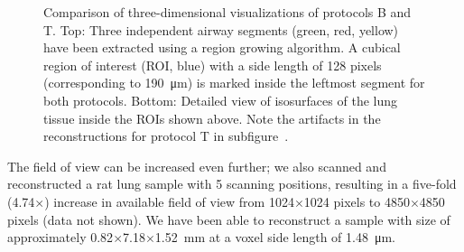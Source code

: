 \begin{figure}[htp]
{%
			}%
		\caption{Comparison of three-dimensional visualizations of protocols B and T. Top: Three independent airway segments (green, red, yellow) have been extracted using a region growing algorithm. A cubical region of interest (ROI, blue) with a side length of 128 pixels (corresponding to \SI{190}{\micro\meter}) is marked inside the leftmost segment for both protocols. Bottom: Detailed view of isosurfaces of the lung tissue inside the ROIs shown above. Note the artifacts in the reconstructions for protocol T in subfigure~.}%
		\label{fig:BvsT}%
	\end{figure}
\fi

The field of view can be increased even further; we also scanned and reconstructed a rat lung sample with 5 scanning positions, resulting in a five-fold (4.74$\times$) increase in available field of view from 1024$\times$1024 pixels to 4850$\times$4850 pixels (data not shown). We have been able to reconstruct a sample with size of approximately 0.82$\times$7.18$\times$\SI{1.52}{\milli\meter} at a voxel side length of \SI{1.48}{\micro\meter}.%

